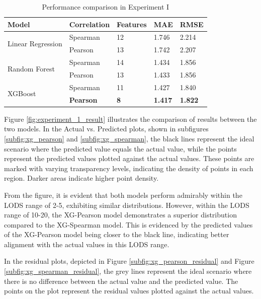 \documentclass[12pt,a4paper,english
]{tunithesis}
\begin{document}
\begin{table}[ht]
\centering
    \caption{Performance comparison in Experiment I}
    \label{table:Perfomance_comparison}
    \begin{tabular}{|l|l|l|l|l|}
        \hline
        \textbf{Model} & \textbf{Correlation} & \textbf{Features} & \textbf{MAE} & \textbf{RMSE} \\ \hline
        \multirow{2}{*}{Linear Regression} & Spearman & 12 & 1.746 & 2.214 \\ \cline{2-5} 
         & Pearson & 13 & 1.742 & 2.207 \\ \hline
        \multirow{2}{*}{Random Forest} & Spearman & 14 & 1.434 & 1.856 \\ \cline{2-5} 
         & Pearson & 13 & 1.433 & 1.856 \\ \hline
        \multirow{2}{*}{XGBoost} & Spearman & 11& 1.427& 1.840\\ \cline{2-5} 
         & \textbf{Pearson} & \textbf{8} & \textbf{1.417} & \textbf{1.822} \\ \hline
    \end{tabular}
\end{table}

Figure \ref{fig:experiment_1_result} illustrates the comparison of results between the two models. In the Actual vs. Predicted plots, shown in subfigures \ref{subfig:xg_pearson} and \ref{subfig:xg_spearman}, the black lines represent the ideal scenario where the predicted value equals the actual value, while the points represent the predicted values plotted against the actual values. These points are marked with varying transparency levels, indicating the density of points in each region. Darker areas indicate higher point density.

From the figure, it is evident that both models perform admirably within the LODS range of 2-5, exhibiting similar distributions. However, within the LODS range of 10-20, the XG-Pearson model demonstrates a superior distribution compared to the XG-Spearman model. This is evidenced by the predicted values of the XG-Pearson model being closer to the black line, indicating better alignment with the actual values in this LODS range.

In the residual plots, depicted in Figure \ref{subfig:xg_pearson_residual} and Figure \ref{subfig:xg_spearman_residual}, the grey lines represent the ideal scenario where there is no difference between the actual value and the predicted value. The points on the plot represent the residual values plotted against the actual values.
\end{document}
